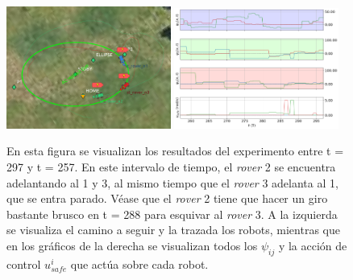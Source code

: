 \begin{figure}[h!]
    \centering
    \includegraphics[trim={0 0cm 0 0cm}, clip, width=0.48\textwidth]{fig/297.png}
    \includegraphics[trim={0 0cm 0 0cm}, clip, width=0.48\textwidth]{fig/data_297.png}
    \caption{En esta figura se visualizan los resultados del experimento entre t = 297 y t = 257. En este intervalo de tiempo, el \textit{rover} 2 se encuentra adelantando al 1 y 3, al mismo tiempo que el \textit{rover} 3 adelanta al 1, que se entra parado. Véase que el \textit{rover} 2 tiene que hacer un giro bastante brusco en t = 288 para esquivar al \textit{rover} 3. A la izquierda se visualiza el camino a seguir y la trazada los robots, mientras que en los gráficos de la derecha se visualizan todos los $\psi_{ij}$ y la acción de control $u_{safe}^i$ que actúa sobre cada robot.}
    \label{fig: exp2}
\end{figure}

\newpage

